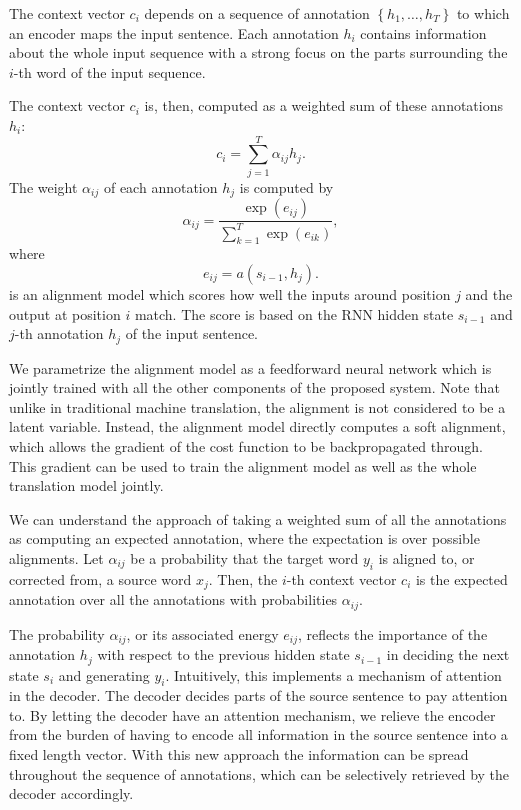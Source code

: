 The context vector $c_i$ depends on a sequence of annotation $\left\{h_1,\ldots,h_T\right\}$ to which an encoder maps the input sentence. Each annotation $h_i$ contains information about the whole input sequence with a strong focus on the parts surrounding the $i$-th word of the input sequence.

The context vector $c_i$ is, then, computed as a weighted sum of these annotations $h_i$:
$$c_i=\sum_{j=1}^{T}\alpha_{ij}h_j.$$
The weight $\alpha_{ij}$ of each annotation $h_j$ is computed by
$$\alpha_{ij}=\frac{\exp\left(e_{ij}\right)}{\sum_{k=1}^{T}\exp\left(e_{ik}\right)},$$
where 
$$e_{ij}=a\left(s_{i-1},h_j\right).$$
is an alignment model which scores how well the inputs around position $j$ and the output at position $i$ match. The score is based on the RNN hidden state $s_{i-1}$  and $j$-th annotation $h_j$ of the input sentence.

We parametrize the alignment model as a feedforward neural network which is jointly trained with all the other components of the proposed system. Note that unlike in traditional machine translation, the alignment is not considered to be a latent variable. Instead, the alignment model directly computes a soft alignment, which allows the gradient of the cost function to be backpropagated through. This gradient can be used to train the alignment model as well as the whole translation model jointly. 

We can understand the approach of taking a weighted sum of all the annotations as computing an expected annotation, where the expectation is over possible alignments. Let $\alpha_{ij}$ be a probability that the target word $y_i$ is aligned to, or corrected from, a source word $x_j$. Then, the $i$-th context vector $c_i$ is the expected annotation over all the annotations with probabilities $\alpha_{ij}$.

The probability $\alpha_{ij} $, or its associated energy $e_{ij}$, reflects the importance of the annotation $h_j$ with respect to the previous hidden state $s_{i-1}$ in deciding the next state $s_i$ and generating $y_i$. Intuitively, this implements a mechanism of attention in the decoder. The decoder decides parts of the source sentence to pay attention to. By letting the decoder have an attention mechanism, we relieve the encoder from the burden of having to encode all information in the source sentence into a fixed length vector. With this new approach the information can be spread throughout the sequence of annotations, which can be selectively retrieved by the decoder accordingly.

